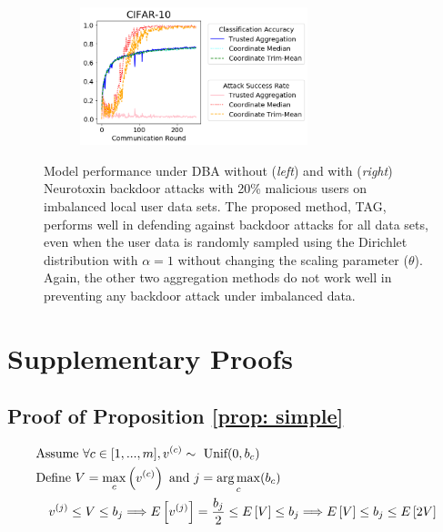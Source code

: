\documentclass{article} %
\begin{document}
\begin{figure}[htp]
  \begin{subfigure}{.35\textwidth}
  \centering
  \end{subfigure}%
  \begin{subfigure}{.65\textwidth}
  \centering
    \includegraphics[height=4cm, left]{make_article/make_visuals/visuals/accuracy--cifar_10--n_malicious2--dba1--beta0.2--neuro_p0.1--alpha1.png}
  \end{subfigure}%
\caption{\footnotesize Model performance under DBA without (\textit{left}) and with (\textit{right}) Neurotoxin backdoor attacks with 20\% malicious users on imbalanced local user data sets. The proposed method, TAG, performs well in defending against backdoor attacks for all data sets, even when the user data is randomly sampled using the Dirichlet distribution with $\alpha = 1$ without changing the scaling parameter ($\theta$). Again, the other two aggregation methods do not work well in preventing any backdoor attack under imbalanced data.}
\label{fig: accuracy--n_malicious2--alpha1}

\end{figure}


\section{Supplementary Proofs}
\subsection{Proof of Proposition \ref{prop: simple}}
\label{app: simple}
\begin{align*}
    & \textrm{Assume } \forall c \in [1,...,m], v^{(c)} \sim \textrm{ Unif}(0, b_c) \\
    & \textrm{Define } V = \max_c \left( v^{(c)} \right) \textrm{ and } j = \operatorname*{arg\,max}_c (b_c) \\
    & \quad v^{(j)} \leq V \leq b_j \Longrightarrow E \left[ v^{(j)} \right] = \dfrac{b_j}{2} \leq E \left[ V \right] \leq b_j  \Longrightarrow E \left[ V \right] \leq b_j \leq E \left[ 2 V \right]
\end{align*}
\end{document}
